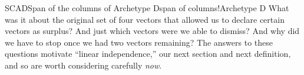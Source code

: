 \begin{example}{SCAD}{Span of the columns of Archetype D}{span of columns!Archetype D}
%
What was it about the original set of four vectors that allowed us to declare certain vectors as surplus?  And just which vectors were we able to dismiss?  And why did we have to stop once we had two vectors remaining?  The answers to these questions motivate ``linear independence,'' our next section and next definition, and so are worth considering carefully {\em now}.
%
\end{example}
%
%
